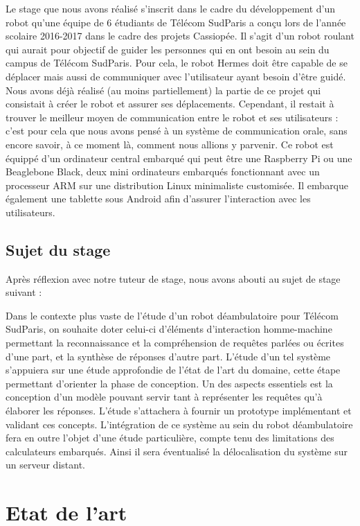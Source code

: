 \documentclass[a4paper,10pt]{report}
\begin{document}
    {Le stage que nous avons réalisé s'inscrit dans le cadre du développement d'un robot qu'une équipe de 6 étudiants de Télécom SudParis a conçu lors de l'année scolaire 2016-2017 dans le cadre des projets Cassiopée. Il s'agit d'un robot roulant qui aurait pour objectif de guider les personnes qui en ont besoin au sein du campus de Télécom SudParis. Pour cela, le robot Hermes doit être capable de se déplacer mais aussi de communiquer avec l'utilisateur ayant besoin d'être guidé. Nous avons déjà réalisé (au moins partiellement) la partie de ce projet qui consistait à créer le robot et assurer ses déplacements. Cependant, il restait à trouver le meilleur moyen de communication entre le robot et ses utilisateurs : c'est pour cela que nous avons pensé à un système de communication orale, sans encore savoir, à ce moment là, comment nous allions y parvenir.}
    {Ce robot est équippé d'un ordinateur central embarqué qui peut être une Raspberry Pi ou une Beaglebone Black, deux mini ordinateurs embarqués fonctionnant avec un processeur ARM sur une distribution Linux minimaliste customisée. Il embarque également une tablette sous Android afin d'assurer l'interaction avec les utilisateurs.}

    \section{Sujet du stage}

    {Après réflexion avec notre tuteur de stage, nous avons abouti au sujet de stage suivant :}

    {Dans le contexte plus vaste de l'étude d'un robot déambulatoire pour Télécom SudParis, on souhaite doter celui-ci d'éléments d'interaction homme-machine permettant la reconnaissance et la compréhension de requêtes parlées ou écrites d'une part, et la synthèse de réponses d'autre part.}
    {L'étude d'un tel système s'appuiera sur une étude approfondie de l'état de l'art du domaine, cette étape permettant d'orienter la phase de conception. Un des aspects essentiels est la conception d'un modèle pouvant servir tant à représenter les requêtes qu'à élaborer les réponses. L'étude s'attachera à fournir un prototype implémentant et validant ces concepts. L'intégration de ce système au sein du robot déambulatoire fera en outre l'objet d'une étude particulière, compte tenu des limitations des calculateurs embarqués. Ainsi il sera éventualisé la délocalisation du système sur un serveur distant.}


    \chapter{Etat de l'art}
\end{document}
